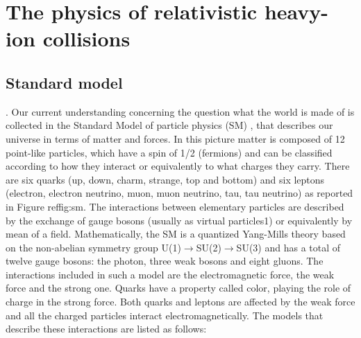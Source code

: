 \section{The physics of relativistic heavy-ion collisions}
\subsection{Standard model}

.                
Our current understanding concerning the question what the world is made of is collected in the Standard Model of particle physics (SM) \cite{cite:sm}, that describes our universe in terms of matter and forces.
In this picture matter is composed of 12 point-like particles, which have a spin of 1/2 (fermions) and can be classified according to how they interact or equivalently to what charges they carry. There are six quarks (up, down, charm, strange, top and bottom) and six leptons (electron, electron neutrino, muon, muon neutrino, tau, tau neutrino) as reported in Figure ref{fig:sm}.
The interactions between elementary particles are described by the exchange of gauge bosons (usually as virtual particles1) or equivalently by mean of a field. Mathematically, the SM is a quantized Yang-Mills theory based on the non-abelian symmetry group U(1)$\rightarrow$SU(2)$\rightarrow$SU(3) and has a total of twelve gauge bosons: the photon, three weak bosons and eight gluons. The interactions included in such a model are the electromagnetic force, the weak force and the strong one. Quarks have a property called color, playing the role of charge in the strong force. Both quarks and leptons are affected by the weak force and all the charged particles interact electromagnetically.
The models that describe these interactions are listed as follows:


